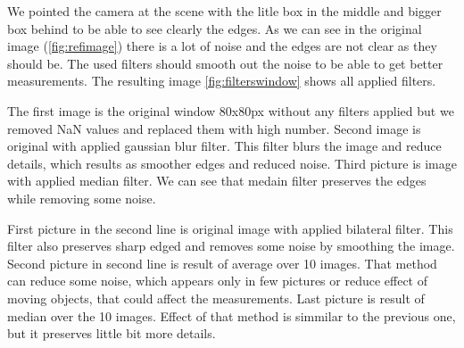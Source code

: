 \documentclass[11pt]{article}
\begin{document}
We pointed the camera at the scene with the litle box in the middle and bigger box behind to be able to see clearly the edges. As we can see in the original image (\vref{fig:refimage}) there is a lot of noise and the edges are not clear as they should be. The used filters should smooth out the noise to be able to get better measurements. The resulting image \vref{fig:filterswindow} shows all applied filters. \par
The first image is the original window 80x80px without any filters applied but we removed NaN values and replaced them with high number. Second image is original with applied gaussian blur filter. This filter blurs the image and reduce details, which results as smoother edges and reduced noise. Third picture is image with applied median filter. We can see that medain filter preserves the edges while removing some noise. \par
First picture in the second line is original image with applied bilateral filter. This filter also preserves sharp edged and removes some noise by smoothing the image. Second picture in second line is result of average over 10 images. That method can reduce some noise, which appears only in few pictures or reduce effect of moving objects, that could affect the measurements. Last picture is result of median over the 10 images. Effect of that method is simmilar to the previous one, but it preserves little bit more details. 
\end{document}
